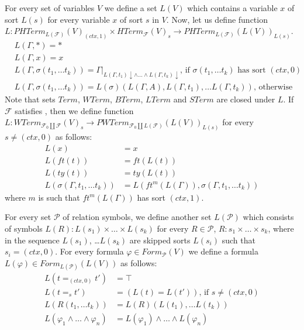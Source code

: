 \documentclass[reqno]{amsart}
\theoremstyle{definition}
\theoremstyle{remark}
\numberwithin{figure}{section}
\begin{document}
For every set of variables $V$ we define a set $L(V)$ which contains a variable $x$ of sort $L(s)$ for every variable $x$ of sort $s$ in $V$.
Now, let us define function $L : PHTerm_{L(\mathcal{F})}(V)_{(ctx,1)} \times HTerm_{\mathcal{F}}(V)_s \to PHTerm_{L(\mathcal{F})}(L(V))_{L(s)}$.
\begin{align*}
& L(\Gamma, *) = * \\
& L(\Gamma, x) = x \\
& L(\Gamma, \sigma(t_1, \ldots t_k)) = \Gamma|_{L(\Gamma,t_1)\!\downarrow \land \ldots \land L(\Gamma,t_k)\!\downarrow}
    \text{, if } \sigma(t_1, \ldots t_k) \text{ has sort } (ctx,0) \\
& L(\Gamma, \sigma(t_1, \ldots t_k)) = L(\sigma)(L(\Gamma, A), L(\Gamma, t_1), \ldots L(\Gamma, t_k)) \text{, otherwise}
\end{align*}
Note that sets $Term$, $WTerm$, $BTerm$, $LTerm$ and $STerm$ are closed under $L$.
If $\mathcal{F}$ satisfies , then we define function
    $L : WTerm_{\mathcal{F}_0 \amalg \mathcal{F}}(V)_s \to PWTerm_{\mathcal{F}_0 \amalg L(\mathcal{F})}(L(V))_{L(s)}$ for every $s \neq (ctx,0)$ as follows:
\begin{align*}
L(x) & = x \\
L(ft(t)) & = ft(L(t)) \\
L(ty(t)) & = ty(L(t)) \\
L(\sigma(\Gamma, t_1, \ldots t_k)) & = L(ft^m(L(\Gamma)), \sigma(\Gamma, t_1, \ldots t_k))
\end{align*}
where $m$ is such that $ft^m(L(\Gamma))$ has sort $(ctx,1)$.

For every set $\mathcal{P}$ of relation symbols, we define another set $L(\mathcal{P})$ which consists of symbols
    $L(R) : L(s_1) \times \ldots \times L(s_k)$ for every $R \in \mathcal{P}$, $R : s_1 \times \ldots \times s_k$,
    where in the sequence $L(s_1)$, \ldots $L(s_k)$ are skipped sorts $L(s_i)$ such that $s_i = (ctx,0)$.
For every formula $\varphi \in Form_\mathcal{P}(V)$ we define a formula $L(\varphi) \in Form_{L(\mathcal{P})}(L(V))$ as follows:
\begin{align*}
L(t =_{(ctx,0)} t') & = \top \\
L(t =_s t') & = (L(t) = L(t')) \text{, if } s \neq (ctx,0) \\
L(R(t_1, \ldots t_k)) & = L(R)(L(t_1), \ldots L(t_k)) \\
L(\varphi_1 \land \ldots \land \varphi_n) & = L(\varphi_1) \land \ldots \land L(\varphi_n)
\end{align*}
\end{document}
